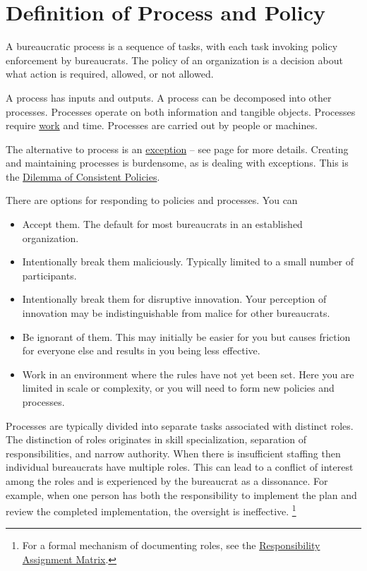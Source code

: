 \section{Definition of Process and Policy\label{sec:definition-of-process}}

A bureaucratic \gls{process} is a sequence of tasks, with each task invoking policy enforcement by bureaucrats. 
The \gls{policy} of an organization is a decision about what action is required, allowed, or not allowed.


A process has inputs and outputs. 
A process can be decomposed into other processes. 
Processes operate on both information and tangible objects. 
Processes require \href{https://en.wikipedia.org/wiki/Work_(physics)}{work} and time. 
Processes are carried out by people or machines.


The alternative to process is an \hyperref[sec:exceptions-to-process]{exception} -- see 
 page \pageref{sec:exceptions-to-process} for more details. 
Creating and maintaining processes is burdensome, as is dealing with exceptions. This is the \hyperref[table:policy-consistency-across-cases]{Dilemma of Consistent Policies}.


There are options for responding to policies and processes. You can
\begin{itemize}
    \item Accept them. The default for most bureaucrats in an established organization.
    \item Intentionally break them maliciously. Typically limited to a small number of participants. 
    \item Intentionally break them for disruptive innovation. Your perception of innovation may be indistinguishable from malice for other bureaucrats. 
    \item Be ignorant of them. This may initially be easier for you but causes friction for everyone else and results in you being less effective.
    \item Work in an environment where the rules have not yet been set. Here you are limited in scale or complexity, or you will need to form new policies and processes.
\end{itemize}

Processes are typically divided into separate tasks associated with distinct roles. The distinction of roles originates in skill specialization, separation of responsibilities, and narrow authority. 
When there is insufficient staffing then individual bureaucrats have multiple roles. This can lead to a conflict of interest among the roles and is experienced by the bureaucrat as a dissonance. For example, when one person has both the responsibility to implement the plan and review the completed implementation, the oversight is ineffective. \footnote{For a formal mechanism of documenting roles, see the 
\href{https://en.wikipedia.org/wiki/Responsibility_assignment_matrix}{Responsibility Assignment Matrix}.
}



